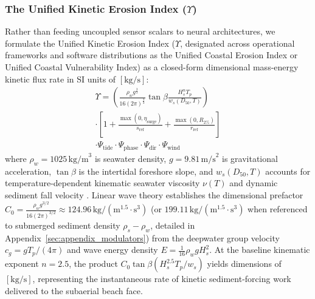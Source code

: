 \documentclass[journal]{IEEEtran}
\begin{document}
\subsubsection{The Unified Kinetic Erosion Index \texorpdfstring{($\Upsilon$)}{(Upsilon)}}
Rather than feeding uncoupled sensor scalars to neural architectures, we formulate the Unified Kinetic Erosion Index ($\Upsilon$, designated across operational frameworks and software distributions as the Unified Coastal Erosion Index or Unified Coastal Vulnerability Index) as a closed-form dimensional mass-energy kinetic flux rate in SI units of $[\text{kg}/\text{s}]$:
\begin{multline}
\Upsilon = \left( \frac{\rho_w g^{\frac{3}{2}}}{16 (2\pi)^{\frac{3}{2}}} \tan\beta \frac{H_s^n T_p}{w_s(D_{50}, T)} \right) \\
\cdot \left[1 + \frac{\max(0, \eta_{\text{surge}})}{s_{\text{ref}}} + \frac{\max(0, R_{2\%})}{r_{\text{ref}}}\right] \\
\cdot \Psi_{\text{tide}} \cdot \Psi_{\text{phase}} \cdot \Psi_{\text{dir}} \cdot \Psi_{\text{wind}}
\label{eq:upsilon_master}
\end{multline}
where $\rho_w = 1025\,\text{kg/m}^3$ is seawater density, $g = 9.81\,\text{m/s}^2$ is gravitational acceleration, $\tan\beta$ is the intertidal foreshore slope, and $w_s(D_{50}, T)$ accounts for temperature-dependent kinematic seawater viscosity $\nu(T)$ and dynamic sediment fall velocity \cite{dietrich1982settling,soulsby1997dynamics}. Linear wave theory establishes the dimensional prefactor $C_0 = \frac{\rho_w g^{3/2}}{16(2\pi)^{3/2}} \approx 124.96\,\text{kg}/(\text{m}^{1.5}\cdot\text{s}^3)$ (or $199.11\,\text{kg}/(\text{m}^{1.5}\cdot\text{s}^3)$ when referenced to submerged sediment density $\rho_s - \rho_w$, detailed in Appendix~\ref{sec:appendix_modulators}) from the deepwater group velocity $c_g = g T_p / (4\pi)$ and wave energy density $E = \frac{1}{16}\rho_w g H_s^2$. At the baseline kinematic exponent $n = 2.5$, the product $C_0 \tan\beta (H_s^{2.5} T_p / w_s)$ yields dimensions of $[\text{kg}/\text{s}]$, representing the instantaneous rate of kinetic sediment-forcing work delivered to the subaerial beach face.
\end{document}
